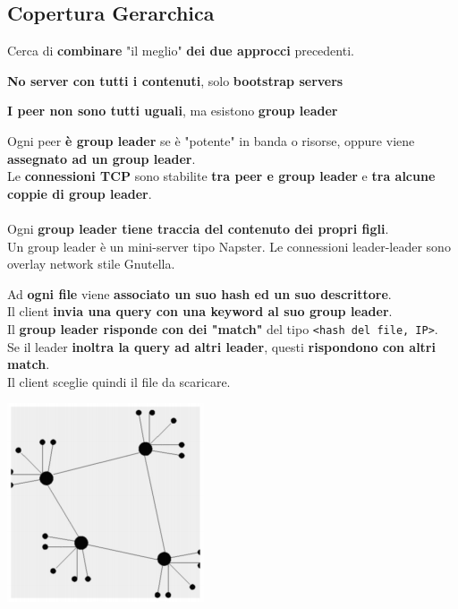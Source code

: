 \documentclass[10pt]{article}
\begin{document}
\subsection{Copertura Gerarchica}
Cerca di \textbf{combinare} "il meglio" \textbf{dei due approcci} precedenti.
\begin{list}{}{}
	\item \textbf{No server con tutti i contenuti}, solo \textbf{bootstrap servers}
	\item \textbf{I peer non sono tutti uguali}, ma esistono \textbf{group leader}
\end{list}
{Ogni peer \textbf{è group leader} se è "potente" in banda o risorse, oppure viene \textbf{assegnato ad un group leader}.\\
Le \textbf{connessioni TCP} sono stabilite \textbf{tra peer e group leader} e \textbf{tra alcune coppie di group leader}.\\\\
Ogni \textbf{group leader tiene traccia del contenuto dei propri figli}.\\
Un group leader è un mini-server tipo Napster. Le connessioni leader-leader sono overlay network stile Gnutella.
\begin{multicols}{2}
Ad \textbf{ogni file} viene \textbf{associato un suo hash ed un suo descrittore}.\\
Il client \textbf{invia una query con una keyword al suo group leader}.\\
Il \textbf{group leader risponde con dei "match"} del tipo \texttt{<hash del file, IP>}.\\
Se il leader \textbf{inoltra la query ad altri leader}, questi \textbf{rispondono con altri match}.\\
Il client sceglie quindi il file da scaricare.
\columnbreak
\begin{center}
\includegraphics[scale=1]{p2pcopger.png}
\end{center}
\end{multicols}
}
\end{document}
